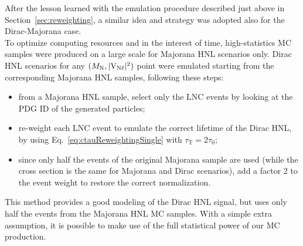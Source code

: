 After the lesson learned with the emulation procedure described just
above in Section~\ref{sec:reweighting}, a similar idea and strategy
was adopted also for the Dirac-Majorana case.\\
To optimize computing resources and in the interest of time,
high-statistics MC samples were produced on a large scale for Majorana
HNL scenarios only.
Dirac HNL scenarios for any $(M_{\mathrm{N}},\mathrm{|V_{\mathrm{N}\ell}|^2})$ point were emulated
starting from the corresponding Majorana HNL samples, following these
steps:
\begin{itemize}
\setlength\itemsep{-0.2em}
\item from a Majorana HNL sample, select only the LNC events by
  looking at the PDG ID of the generated particles;
\item re-weight each LNC event to emulate the correct lifetime of the
  Dirac HNL, by using Eq.~\ref{eq:ctauReweightingSingle} with
  $\tau_{\mathrm{T}}=2\tau_0$;
\item since only half the events of the original Majorana sample are
  used (while the cross section is the same for Majorana and Dirac
  scenarios), add a factor 2 to the event weight to restore the correct
  normalization.
\end{itemize}
This method provides a good modeling of the Dirac HNL signal, but
uses only half the events from the Majorana HNL MC samples. With a
simple extra assumption, it is possible to make use of the full
statistical power of our MC production.

